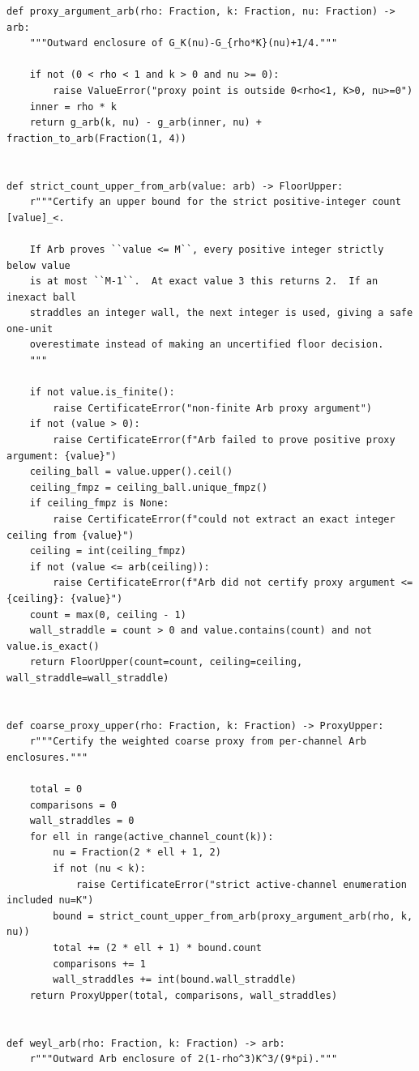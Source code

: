 \documentclass[11pt]{article}
\numberwithin{equation}{section}
\theoremstyle{definition}
\theoremstyle{remark}
\begin{document}
\begin{lstlisting}
def proxy_argument_arb(rho: Fraction, k: Fraction, nu: Fraction) -> arb:
    """Outward enclosure of G_K(nu)-G_{rho*K}(nu)+1/4."""

    if not (0 < rho < 1 and k > 0 and nu >= 0):
        raise ValueError("proxy point is outside 0<rho<1, K>0, nu>=0")
    inner = rho * k
    return g_arb(k, nu) - g_arb(inner, nu) + fraction_to_arb(Fraction(1, 4))


def strict_count_upper_from_arb(value: arb) -> FloorUpper:
    r"""Certify an upper bound for the strict positive-integer count [value]_<.

    If Arb proves ``value <= M``, every positive integer strictly below value
    is at most ``M-1``.  At exact value 3 this returns 2.  If an inexact ball
    straddles an integer wall, the next integer is used, giving a safe one-unit
    overestimate instead of making an uncertified floor decision.
    """

    if not value.is_finite():
        raise CertificateError("non-finite Arb proxy argument")
    if not (value > 0):
        raise CertificateError(f"Arb failed to prove positive proxy argument: {value}")
    ceiling_ball = value.upper().ceil()
    ceiling_fmpz = ceiling_ball.unique_fmpz()
    if ceiling_fmpz is None:
        raise CertificateError(f"could not extract an exact integer ceiling from {value}")
    ceiling = int(ceiling_fmpz)
    if not (value <= arb(ceiling)):
        raise CertificateError(f"Arb did not certify proxy argument <= {ceiling}: {value}")
    count = max(0, ceiling - 1)
    wall_straddle = count > 0 and value.contains(count) and not value.is_exact()
    return FloorUpper(count=count, ceiling=ceiling, wall_straddle=wall_straddle)


def coarse_proxy_upper(rho: Fraction, k: Fraction) -> ProxyUpper:
    r"""Certify the weighted coarse proxy from per-channel Arb enclosures."""

    total = 0
    comparisons = 0
    wall_straddles = 0
    for ell in range(active_channel_count(k)):
        nu = Fraction(2 * ell + 1, 2)
        if not (nu < k):
            raise CertificateError("strict active-channel enumeration included nu=K")
        bound = strict_count_upper_from_arb(proxy_argument_arb(rho, k, nu))
        total += (2 * ell + 1) * bound.count
        comparisons += 1
        wall_straddles += int(bound.wall_straddle)
    return ProxyUpper(total, comparisons, wall_straddles)


def weyl_arb(rho: Fraction, k: Fraction) -> arb:
    r"""Outward Arb enclosure of 2(1-rho^3)K^3/(9*pi)."""


\end{lstlisting}
\end{document}
